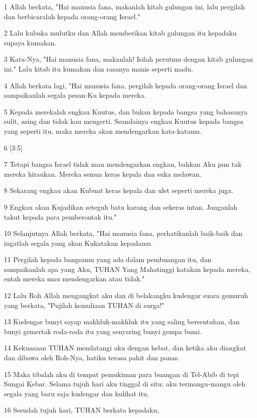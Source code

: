\par 1 Allah berkata, "Hai manusia fana, makanlah kitab gulungan ini, lalu pergilah dan berbicaralah kepada orang-orang Israel."
\par 2 Lalu kubuka mulutku dan Allah memberikan kitab gulungan itu kepadaku supaya kumakan.
\par 3 Kata-Nya, "Hai manusia fana, makanlah! Isilah perutmu dengan kitab gulungan ini." Lalu kitab itu kumakan dan rasanya manis seperti madu.
\par 4 Allah berkata lagi, "Hai manusia fana, pergilah kepada orang-orang Israel dan sampaikanlah segala pesan-Ku kepada mereka.
\par 5 Kepada merekalah engkau Kuutus, dan bukan kepada bangsa yang bahasanya sulit, asing dan tidak kau mengerti. Seandainya engkau Kuutus kepada bangsa yang seperti itu, maka mereka akan mendengarkan kata-katamu.
\par 6 [3:5]
\par 7 Tetapi bangsa Israel tidak mau mendengarkan engkau, bahkan Aku pun tak mereka hiraukan. Mereka semua keras kepala dan suka melawan.
\par 8 Sekarang engkau akan Kubuat keras kepala dan ulet seperti mereka juga.
\par 9 Engkau akan Kujadikan seteguh batu karang dan sekeras intan. Janganlah takut kepada para pemberontak itu."
\par 10 Selanjutnya Allah berkata, "Hai manusia fana, perhatikanlah baik-baik dan ingatlah segala yang akan Kukatakan kepadamu.
\par 11 Pergilah kepada bangsamu yang ada dalam pembuangan itu, dan sampaikanlah apa yang Aku, TUHAN Yang Mahatinggi katakan kepada mereka, entah mereka mau mendengarkan atau tidak."
\par 12 Lalu Roh Allah mengangkat aku dan di belakangku kudengar suara gemuruh yang berkata, "Pujilah kemuliaan TUHAN di surga!"
\par 13 Kudengar bunyi sayap makhluk-makhluk itu yang saling bersentuhan, dan bunyi gemertak roda-roda itu yang senyaring bunyi gempa bumi.
\par 14 Kekuasaan TUHAN mendatangi aku dengan hebat, dan ketika aku diangkat dan dibawa oleh Roh-Nya, hatiku terasa pahit dan panas.
\par 15 Maka tibalah aku di tempat pemukiman para buangan di Tel-Abib di tepi Sungai Kebar. Selama tujuh hari aku tinggal di situ; aku termangu-mangu oleh segala yang baru saja kudengar dan kulihat itu.
\par 16 Sesudah tujuh hari, TUHAN berkata kepadaku,
